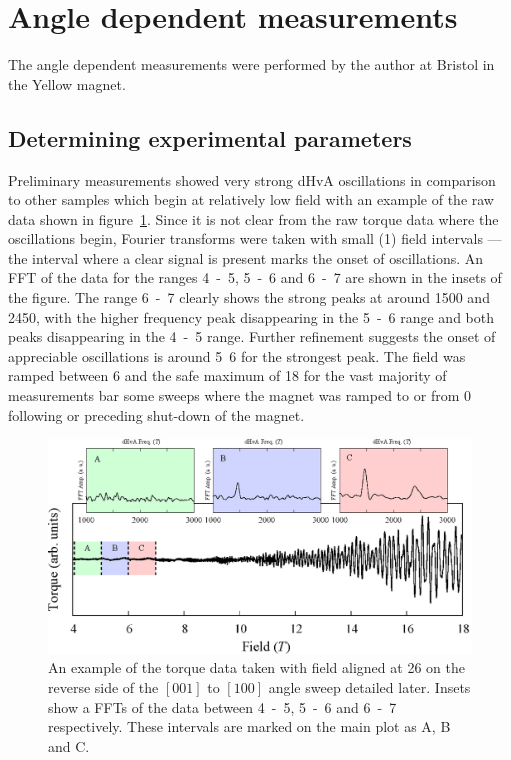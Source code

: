 
\section{Angle dependent measurements}
    \label{Sec:ResD:AngleDependentMeasurements}

The angle dependent measurements were performed by the author at Bristol in the Yellow magnet.

\subsection{Determining experimental parameters}

Preliminary measurements showed very strong \ac{dHvA} oscillations in comparison to other samples which begin at relatively low field with an example of the raw data shown in figure~\ref{Fig:ResD:RawOscillations}. Since it is not clear from the raw torque data where the oscillations begin, Fourier transforms were taken with small (\unit{1}{\tesla}) field intervals --- the interval where a clear signal is present marks the onset of oscillations. An \ac{FFT} of the data for the ranges \unit{4-5}{\tesla}, \unit{5-6}{\tesla} and \unit{6-7}{\tesla} are shown in the insets of the figure. The range \unit{6-7}{\tesla} clearly shows the strong peaks at around \unit{1500}{\tesla} and \unit{2450}{\tesla}, with the higher frequency peak disappearing in the \unit{5-6}{\tesla} range and both peaks disappearing in the \unit{4-5}{\tesla} range. Further refinement suggests the onset of appreciable oscillations is around \unit{5.6}{\tesla} for the strongest peak. The field was ramped between \unit{6}{\tesla} and the safe maximum of \unit{18}{\tesla} for the vast majority of measurements bar some sweeps where the magnet was ramped to or from \unit{0}{\tesla} following or preceding shut-down of the magnet.

\begin{figure}[htbp]
    \begin{center}
        \includegraphics[scale=0.7]{Chapter-dHvABaFe2P2/Figures/AngleDepMeasurements/RawOscillations/RawOscillations}
        \caption{An example of the torque data taken with field aligned at \unit{26}{\degree} on the reverse side of the $[001]$ to $[100]$ angle sweep detailed later. Insets show a \acp{FFT} of the data between \unit{4-5}{\tesla}, \unit{5-6}{\tesla} and \unit{6-7}{\tesla} respectively. These intervals are marked on the main plot as A, B and C.}
        \label{Fig:ResD:RawOscillations}
    \end{center}
\end{figure}


